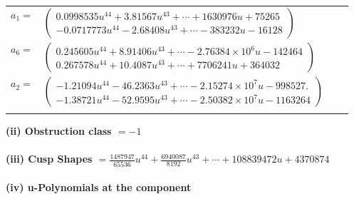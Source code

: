 \documentclass[1p]{elsarticle_modified}
\theoremstyle{definition}
\begin{document}
\begin{tabular}{m{7pt} m{180pt} m{7pt} m{180pt} }
\flushright $a_{1}=$&$\begin{pmatrix}0.0998535 u^{44}+3.81567 u^{43}+\cdots+1630976 u+75265\\-0.0717773 u^{44}-2.68408 u^{43}+\cdots-383232 u-16128\end{pmatrix}$ \\
\flushright $a_{6}=$&$\begin{pmatrix}0.245605 u^{44}+8.91406 u^{43}+\cdots-2.76384\times10^{6} u-142464\\0.267578 u^{44}+10.4087 u^{43}+\cdots+7706241 u+364032\end{pmatrix}$ \\
\flushright $a_{2}=$&$\begin{pmatrix}-1.21094 u^{44}-46.2363 u^{43}+\cdots-2.15274\times10^{7} u-998527.\\-1.38721 u^{44}-52.9595 u^{43}+\cdots-2.50382\times10^{7} u-1163264\end{pmatrix}$\\&\end{tabular}
\flushleft \textbf{(ii) Obstruction class $= -1$}\\~\\
\flushleft \textbf{(iii) Cusp Shapes $= \frac{1487947}{65536} u^{44}+\frac{6940087}{8192} u^{43}+\cdots+108839472 u+4370874$}\\~\\
\newpage\renewcommand{\arraystretch}{1}
\flushleft \textbf{(iv) u-Polynomials at the component}\newline \\
\end{document}
